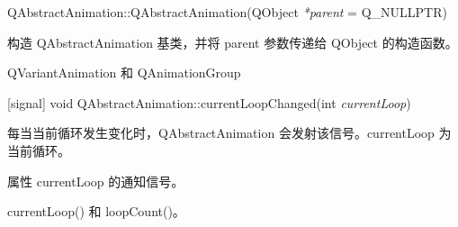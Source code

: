 QAbstractAnimation::QAbstractAnimation(QObject \emph{*parent} = Q\_NULLPTR)

构造 QAbstractAnimation 基类，并将 parent 参数传递给 QObject 的构造函数。

\begin{seeAlso}
QVariantAnimation 和 QAnimationGroup
\end{seeAlso}

[signal] void QAbstractAnimation::currentLoopChanged(int \emph{currentLoop})

每当当前循环发生变化时，QAbstractAnimation 会发射该信号。currentLoop 为当前循环。

\begin{notice}
属性 currentLoop 的通知信号。
\end{notice}


\begin{seeAlso}
currentLoop() 和 loopCount()。
\end{seeAlso}
